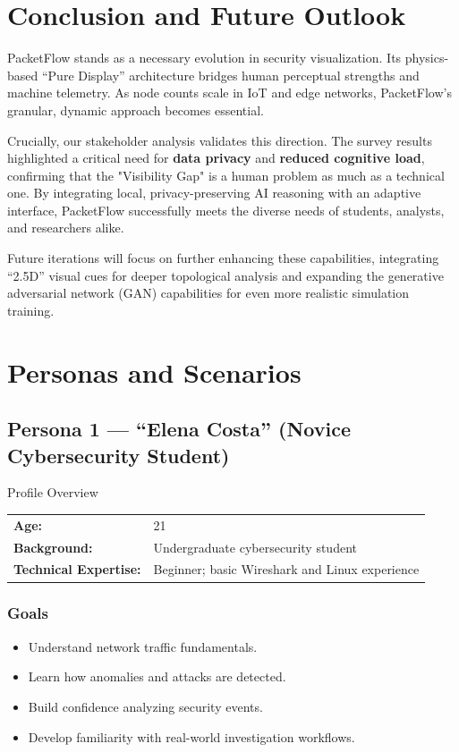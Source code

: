 \documentclass[
    11pt, 
    a4paper, 
    parskip=half, 
    headsepline,       %
    DIV=12             %
]{scrartcl}
\begin{document}

\section{Conclusion and Future Outlook}

PacketFlow stands as a necessary evolution in security visualization. Its physics-based ``Pure Display'' architecture bridges human perceptual strengths and machine telemetry. As node counts scale in IoT and edge networks, PacketFlow’s granular, dynamic approach becomes essential.

Crucially, our stakeholder analysis validates this direction. The survey results highlighted a critical need for \textbf{data privacy} and \textbf{reduced cognitive load}, confirming that the "Visibility Gap" is a human problem as much as a technical one. By integrating local, privacy-preserving AI reasoning with an adaptive interface, PacketFlow successfully meets the diverse needs of students, analysts, and researchers alike.

Future iterations will focus on further enhancing these capabilities, integrating ``2.5D'' visual cues for deeper topological analysis and expanding the generative adversarial network (GAN) capabilities for even more realistic simulation training.


\section{Personas and Scenarios}

\subsection{Persona 1 --- ``Elena Costa'' (Novice Cybersecurity Student)}

\begin{personabox}{Profile Overview}
    \begin{tabularx}{\linewidth}{@{}lX@{}}
        \textbf{Age:} & 21 \\
        \textbf{Background:} & Undergraduate cybersecurity student \\
        \textbf{Technical Expertise:} & Beginner; basic Wireshark and Linux experience
    \end{tabularx}
\end{personabox}

\subsubsection*{Goals}
\begin{itemize}
    \item Understand network traffic fundamentals.
    \item Learn how anomalies and attacks are detected.
    \item Build confidence analyzing security events.
    \item Develop familiarity with real-world investigation workflows.
\end{itemize}
\end{document}
